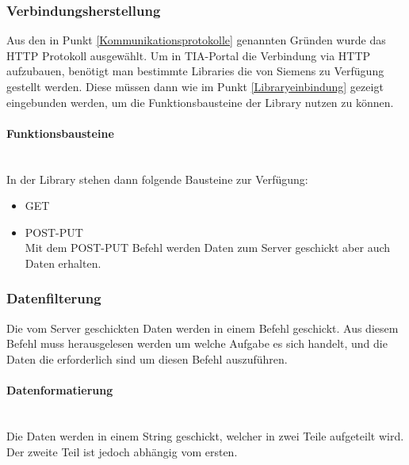             

    
    \subsubsection{Verbindungsherstellung}
    Aus den in Punkt \ref{Kommunikationsprotokolle} genannten Gründen wurde das HTTP Protokoll ausgewählt. Um in TIA-Portal die Verbindung via HTTP aufzubauen, benötigt man bestimmte Libraries die von Siemens zu Verfügung gestellt werden. Diese müssen dann wie im Punkt \ref{Libraryeinbindung} gezeigt eingebunden werden, um die Funktionsbausteine der Library nutzen zu können. 

        \paragraph{Funktionsbausteine} \mbox{} \\
        In der Library stehen dann folgende Bausteine zur Verfügung:

        \begin{itemize}
            \item GET
            \item POST-PUT \\
            Mit dem POST-PUT Befehl werden Daten zum Server geschickt aber auch Daten erhalten. 
        \end{itemize}


    \subsubsection{Datenfilterung}
    Die vom Server geschickten Daten werden in einem Befehl geschickt. Aus diesem Befehl muss herausgelesen werden um welche Aufgabe es sich handelt, und die Daten die erforderlich sind um diesen Befehl auszuführen.

        \paragraph{Datenformatierung}\mbox{}\\
        Die Daten werden in einem String geschickt, welcher in zwei Teile aufgeteilt wird. Der zweite Teil ist jedoch abhängig vom ersten. \\
        
